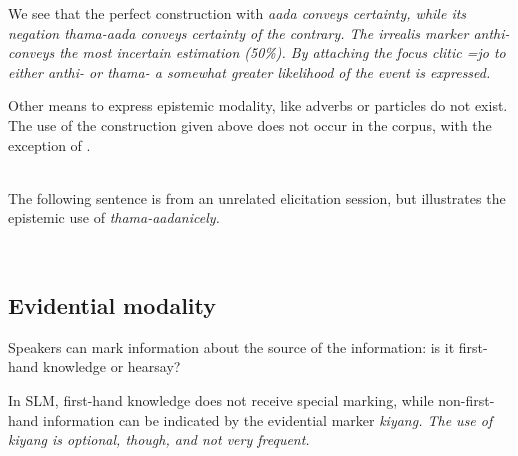 We see that the perfect construction with \em aada \em conveys certainty, while its negation \em thama-aada \em conveys certainty of the contrary. The irrealis marker \em anthi- \em conveys the most incertain estimation (50\%). By attaching the focus clitic \em =jo \em to either \em anthi- \em or \em thama- \em a somewhat greater likelihood of the event is expressed.

Other means to express epistemic modality, like adverbs or particles do not exist. The use of the construction given above does not occur in the corpus, with the exception of .


 \\
The following sentence is from an unrelated elicitation session, but illustrates the epistemic use of \em thama-aada\em nicely.

 \\
\subsection{Evidential modality}\label{sec:func:Evidentialmodality}
Speakers can mark information about the source of the information: is it first-hand knowledge or hearsay?

In SLM, first-hand knowledge does not receive special marking, while non-first-hand information can be indicated by the evidential marker \em kiyang\em{}. The use of \em kiyang \em is optional, though, and not very frequent.

\\


